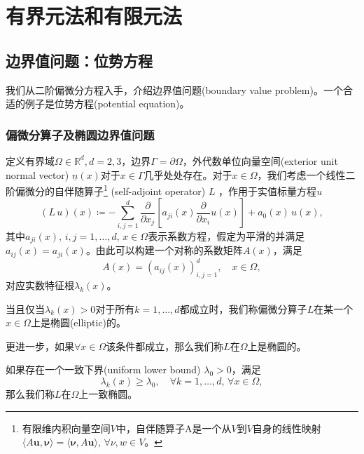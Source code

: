\chapter{有界元法和有限元法}
\label{sec:bem-fem-methods}

\section{边界值问题：位势方程}

我们从二阶偏微分方程入手，介绍边界值问题(boundary value problem)。一个合适的例子是位势方程(potential equation)。

\subsection{偏微分算子及椭圆边界值问题}

定义有界域$\Omega \in \mathbb{R}^d, d=2,3$，边界$\Gamma = \partial \Omega$，外代数单位向量空间(exterior unit normal vector) $\underline{n}(x)$对于$x \in \Gamma$几乎处处存在。对于$x \in \Omega$，我们考虑一个线性二阶偏微分的自伴随算子\footnote{有限维内积向量空间$V$中，自伴随算子A是一个从$V$到$V$自身的线性映射$\langle A \bm{u}, \bm{\nu} \rangle = \langle \bm{\nu}, A \bm{u} \rangle, \, \forall \nu, w \in V$。}
(self-adjoint operator) $L$
，作用于实值标量方程$u$
\begin{equation}
  \label{eq:bvp-self-adjoint-pde-operator}
  \left( L \, u \right)(x) \coloneqq - \sum_{i,j=1}^d \frac{\partial}{\partial x_j} \left[ a_{ji} (x) \frac{\partial}{\partial x_i} u(x)\right] + a_0(x)\, u(x),
\end{equation}
其中$a_{ji}(x), \, i,j =1,\ldots, d, \, x \in \Omega$表示系数方程，假定为平滑的并满足$a_{ij}(x) = a_{ji}(x)$。由此可以构建一个对称的系数矩阵$A(x)$，满足
\begin{equation*}
  A(x) = \left( a_{ij}(x) \right)_{i,j=1}^{d}, \quad x \in \Omega,
\end{equation*}
对应实数特征根$\lambda_{k}(x)$。

当且仅当$\lambda_{k}(x) > 0$对于所有$k=1,\ldots,d$都成立时，我们称偏微分算子$L$在某一个$x \in \Omega$上是椭圆(elliptic)的。

更进一步，如果$\forall x \in \Omega$该条件都成立，那么我们称$L$在$\Omega$上是椭圆的。

如果存在一个一致下界(uniform lower bound) $\lambda_0 > 0$，满足
\begin{equation*}
  \lambda_k (x) \ge \lambda_0, \quad \forall k = 1,\ldots,d, \, \forall x \in \Omega,
\end{equation*}
那么我们称$L$在$\Omega$上一致椭圆。

